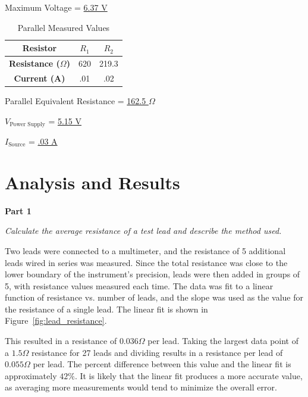 \documentclass[twocolumn,english]{IEEEtran}
\theoremstyle{plain}
\theoremstyle{plain}
\begin{document}
  \begin{centering}
   Maximum Voltage = \underline{6.37 V}

  \begin{table}[H]
  \centering{}
  \caption{Parallel Measured Values}
  \label{tb:part1_parallel}
  \begin{tabular}{|c|c|c|}
  \hline
  \textbf{Resistor}    & $R_1$  & $R_2$    \\ \hline
  \textbf{Resistance ($\Omega$)}  & 620 & 219.3 \\ \hline
  \textbf{Current (A)} & .01 & .02   \\ \hline
  \end{tabular}
  \end{table}


  Parallel Equivalent Resistance = \underline{162.5 $\Omega$}

  $V_{\text{Power Supply}}$ = \underline{5.15 V}

  $I_{\text{Source}}$ = \underline{.03 A}

  \end{centering}


\section{Analysis and Results}
\noindent\textbf{Part 1}

\textit{Calculate the average resistance of a test lead and describe the method used.}

Two leads were connected to a multimeter, and the resistance of 5 additional leads wired in series was measured. Since the total resistance was close to the lower boundary of the instrument's precision, leads were then added in groups of 5, with resistance values measured each time. The data was fit to a linear function of resistance vs. number of leads, and the slope was used as the value for the resistance of a single lead. The linear fit is shown in Figure~\ref{fig:lead_resistance}.

This resulted in a resistance of $0.036 \Omega$ per lead. Taking the largest data point of a $1.5 \Omega$ resistance for 27 leads and dividing results in a resistance per lead of $0.055 \Omega$ per lead. The percent difference between this value and the linear fit is approximately $42\%$. It is likely that the linear fit produces a more accurate value, as averaging more measurements would tend to minimize the overall error.
\end{document}

